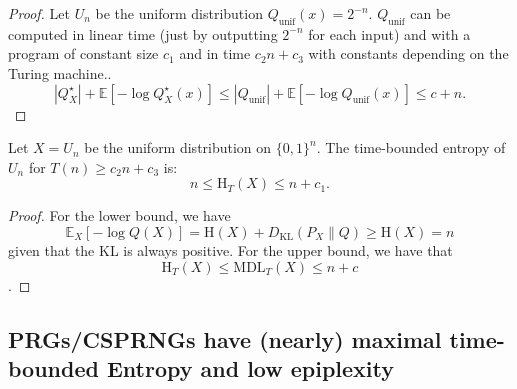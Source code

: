 \documentclass[twoside]{article}
\newcommand{\rH}{\mathrm{H}}
\begin{document}
\begin{proof}
Let $U_n$ be the uniform distribution $Q_{\mathrm{unif}}(x) = 2^{-n}$.
$Q_{\mathrm{unif}}$ can be computed in linear time (just by outputting $2^{-n}$ for each input) and with a program of constant size $c_1$ and in time $c_2n+c_3$ with constants depending on the Turing machine..
%
$$|Q^\star_X| + \mathbb{E}[-\log Q^\star_X(x)] \leq |Q_{\mathrm{unif}}| + \mathbb{E}[-\log Q_{\mathrm{unif}}(x)] \leq c + n.$$
\end{proof}

\begin{lemma}
    Let $X = U_n$ be the uniform distribution on $\{0,1\}^n$. The time-bounded entropy of $U_n$ for $T(n)\ge c_2n+c_3$ is:
    \begin{equation}
        n\le \rH_T(X) \le n+c_1.
    \end{equation}
\end{lemma}
\begin{proof}

For the lower bound, we have $$\mathbb{E}_X[-\log Q(X)] = \rH(X) + D_{\mathrm{KL}}(P_X \| Q) \ge \rH(X)=n$$ given that the KL is always positive.
For the upper bound, we have that $$\rH_T(X)\le \mathrm{MDL}_T(X) \le n+c$$.
\end{proof}
%
%
%
%
%


\subsection{PRGs/CSPRNGs have (nearly) maximal time-bounded Entropy and low epiplexity}\label{app:csprng}
\end{document}
